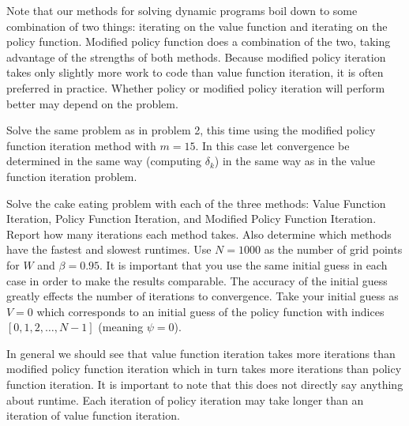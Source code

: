 Note that our methods for solving dynamic programs boil down to some combination of two things: iterating on the value function and iterating on the policy function.  Modified policy function does a combination of the two, taking advantage of the strengths of both methods.  Because modified policy iteration takes only slightly more work to code than value function iteration, it is often preferred in practice.  Whether policy or modified policy iteration will perform better may depend on the problem.

\begin{problem}
Solve the same problem as in problem 2, this time using the modified policy function iteration method with $m=15$.  In this case let convergence be determined in the same way (computing $\delta_k$) in the same way as in the value function iteration problem.
\end{problem}

\begin{problem}
Solve the cake eating problem with each of the three methods: Value Function Iteration, Policy Function Iteration, and Modified Policy Function Iteration.  Report how many iterations each method takes.  Also determine which methods have the fastest and slowest runtimes.  Use $N= 1000$ as the number of grid points for $W$ and $\beta = 0.95$.  It is important that you use the same initial guess in each case in order to make the results comparable.  The accuracy of the initial guess greatly effects the number of iterations to convergence.  Take your initial guess as $V = 0$ which corresponds to an initial guess of the policy function with indices $[0,1,2,\ldots, N-1]$ (meaning $\psi = 0$).
\end{problem}

In general we should see that value function iteration takes more iterations than modified policy function iteration which in turn takes more iterations than policy function iteration.  It is important to note that this does not directly say anything about runtime.  Each iteration of policy iteration may take longer than an iteration of value function iteration.

